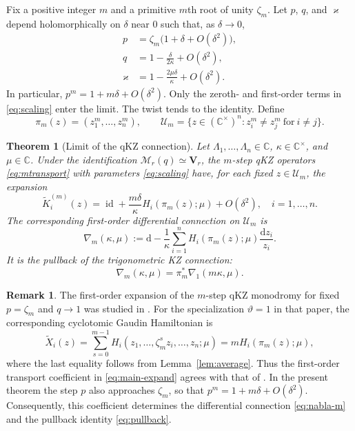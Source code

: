 \documentclass[12pt]{amsart}
\newtheorem{thm}{Theorem}[section]
\theoremstyle{definition}
\numberwithin{equation}{section}
\theoremstyle{definition}
\newtheorem*{rem}{Remark}
\let\mc\mathcal
\let\ka\kappa
\let\La\Lambda
\let\on\operatorname
\def\C{{\mathbb C}}
\def\id{\on{id}}
\def\beq{\begin{equation}}
\def\eeq{\end{equation}}
\begin{document}
Fix a positive integer $m$ and a primitive $m$th root of unity
$\zeta_m$.  Let $p$, $q$, and $\varkappa$ depend holomorphically
on $\delta$ near $0$ such that, as $\delta\to0$,
\beq\label{eq:scaling}
\begin{aligned}
 p&=\zeta_m\bigl(1+\delta+O(\delta^2)\bigr),\\
 q&=1-\frac{\delta}{2\ka}+O(\delta^2),\\
 \varkappa&=1-\frac{2\mu\delta}{\ka}+O(\delta^2).
\end{aligned}
\eeq
In particular, $p^m=1+m\delta+O(\delta^2)$.
Only the zeroth- and first-order terms in \eqref{eq:scaling}
enter the limit.  The twist tends to the identity.
Define
\[
 \pi_m(z)=(z_1^m,\ldots,z_n^m),\qquad
 \mc U_m=\{z\in(\C^\times)^n:z_i^m\ne z_j^m\ \text{for}\ i\ne j\}.
\]
\begin{thm}[Limit of the qKZ connection]\label{thm:limit}
Let $\La_1,\ldots,\La_n\in\C$, $\ka\in\C^\times$,
and $\mu\in\C$.  Under the identification
$\mc M_r(q)\simeq\mathbf V_r$, the $m$-step qKZ operators
\eqref{eq:mtransport} with parameters \eqref{eq:scaling}
have, for each fixed $z\in\mc U_m$, the expansion
\beq\label{eq:main-expand}
 \boxed{\quad
 \widetilde K_i^{(m)}(z)
 =\id+\frac{m\delta}{\ka}H_i(\pi_m(z);\mu)+O(\delta^2),
 \quad i=1,\ldots,n.\quad}
\eeq
The corresponding first-order differential connection on
$\mc U_m$ is
\beq\label{eq:nabla-m}
 \nabla_m(\ka,\mu)
 :=\mathrm{d}-\frac1\ka\sum_{i=1}^n
 H_i(\pi_m(z);\mu)\frac{\mathrm{d}z_i}{z_i}.
\eeq
It is the pullback of the trigonometric KZ connection:
\beq\label{eq:pullback}
 \boxed{\qquad
 \nabla_m(\ka,\mu)=\pi_m^*\nabla_1(m\ka,\mu).
 \qquad}
\eeq
\end{thm}

\begin{rem}
The first-order expansion of the $m$-step qKZ monodromy
for fixed $p=\zeta_m$ and $q\to1$ was studied in
\cite[Appendix~A]{TV26}. For the specialization
$\vartheta=1$ in that paper, the corresponding
cyclotomic Gaudin Hamiltonian is
\[
 \widetilde X_i(z)
 =\sum_{s=0}^{m-1}
 H_i(z_1,\ldots,\zeta_m^s z_i,\ldots,z_n;\mu)
 =mH_i(\pi_m(z);\mu),
\]
where the last equality follows from
Lemma~\ref{lem:average}.
Thus the first-order transport coefficient in
\eqref{eq:main-expand} agrees with that of \cite{TV26}.
In the present theorem the step $p$ also approaches
$\zeta_m$, so that $p^m=1+m\delta+O(\delta^2)$.
Consequently, this coefficient determines the
differential connection \eqref{eq:nabla-m} and
the pullback identity \eqref{eq:pullback}.
\end{rem}
\end{document}
